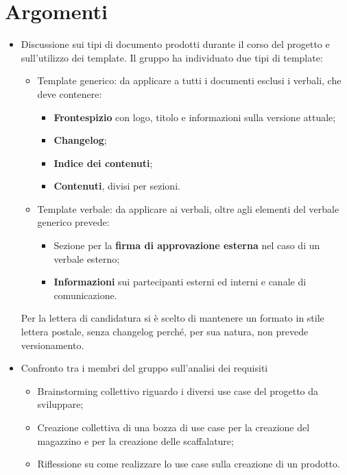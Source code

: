 \section{Argomenti}
    \begin{itemize}
        \item Discussione sui tipi di documento prodotti durante il corso del progetto e sull'utilizzo dei template. Il gruppo ha individuato due tipi di template:
        \begin{itemize}
            \item Template generico: da applicare a tutti i documenti esclusi i verbali, che deve contenere:
            \begin{itemize}
                \item \textbf{Frontespizio} con logo, titolo e informazioni sulla versione attuale;
                \item \textbf{Changelog};
                \item \textbf{Indice dei contenuti};
                \item \textbf{Contenuti}, divisi per sezioni.
            \end{itemize}
            \item Template verbale: da applicare ai verbali, oltre agli elementi del verbale generico prevede:
            \begin{itemize}
                \item Sezione per la \textbf{firma di approvazione esterna} nel caso di un verbale esterno;
                \item \textbf{Informazioni} sui partecipanti esterni ed interni e canale di comunicazione.
            \end{itemize}
        \end{itemize}
        Per la lettera di candidatura si è scelto di mantenere un formato in stile lettera postale, senza changelog perché, per sua natura, non prevede versionamento.
        \item Confronto tra i membri del gruppo sull'analisi dei requisiti
            \begin{itemize}
                \item Brainstorming collettivo riguardo i diversi use case del progetto da sviluppare;
                \item Creazione collettiva di una bozza di use case per la creazione del magazzino e per la creazione delle scaffalature;
                \item Riflessione su come realizzare lo use case sulla creazione di un prodotto.

\end{itemize}
\end{itemize}
